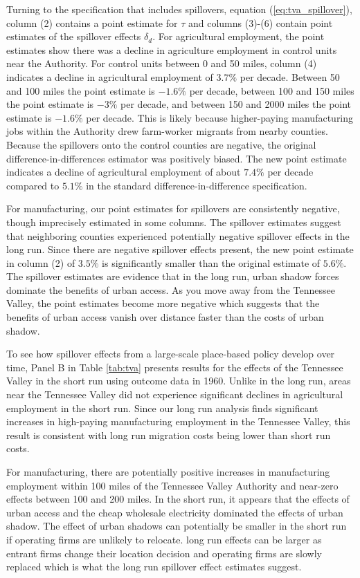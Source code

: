 \documentclass[11pt]{article}
\begin{document}
Turning to the specification that includes spillovers, equation (\ref{eq:tva_spillover}), column (2) contains a point estimate for $\tau$ and columns (3)-(6) contain point estimates of the spillover effects $\delta_d$. For agricultural employment, the point estimates show there was a decline in agriculture employment in control units near the Authority. For control units between 0 and 50 miles, column (4) indicates a decline in agricultural employment of $3.7\%$ per decade. Between 50 and 100 miles the point estimate is $-1.6\%$ per decade, between 100 and 150 miles the point estimate is $-3\%$ per decade, and between 150 and 2000 miles the point estimate is $-1.6\%$ per decade. This is likely because higher-paying manufacturing jobs within the Authority drew farm-worker migrants from nearby counties. Because the spillovers onto the control counties are negative, the original difference-in-differences estimator was positively biased. The new point estimate indicates a decline of agricultural employment of about $7.4\%$ per decade compared to $5.1\%$ in the standard difference-in-difference specification. 

For manufacturing, our point estimates for spillovers are consistently negative, though imprecisely estimated in some columns. The spillover estimates suggest that neighboring counties experienced potentially negative spillover effects in the long run. Since there are negative spillover effects present, the new point estimate in column (2) of $3.5\%$ is significantly smaller than the original estimate of $5.6\%$. The spillover estimates are evidence that in the long run, urban shadow forces dominate the benefits of urban access. As you move away from the Tennessee Valley, the point estimates become more negative which suggests that the benefits of urban access vanish over distance faster than the costs of urban shadow.

To see how spillover effects from a large-scale place-based policy develop over time, Panel B in Table \ref{tab:tva} presents results for the effects of the Tennessee Valley in the short run using outcome data in 1960. Unlike in the long run, areas near the Tennessee Valley did not experience significant declines in agricultural employment in the short run. Since our long run analysis finds significant increases in high-paying manufacturing employment in the Tennessee Valley, this result is consistent with long run migration costs being lower than short run costs.

For manufacturing, there are potentially positive increases in manufacturing employment within 100 miles of the Tennessee Valley Authority and near-zero effects between 100 and 200 miles. In the short run, it appears that the effects of urban access and the cheap wholesale electricity dominated the effects of urban shadow. The effect of urban shadows can potentially be smaller in the short run if operating firms are unlikely to relocate. long run effects can be larger as entrant firms change their location decision and operating firms are slowly replaced which is what the long run spillover effect estimates suggest.
\end{document}
